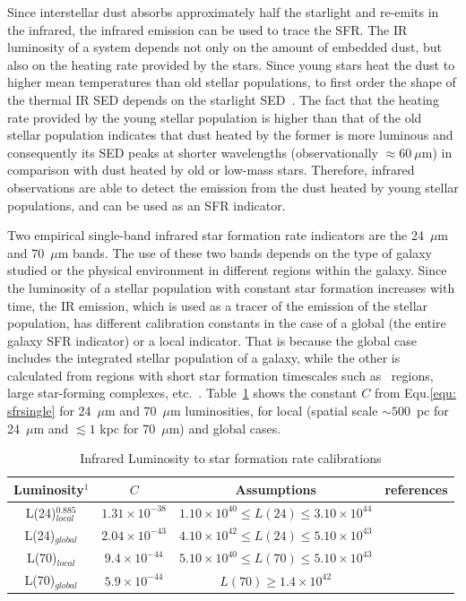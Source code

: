 Since interstellar dust absorbs approximately half the starlight and re-emits in the infrared, the infrared emission can be used to trace the SFR.
The IR luminosity of a system depends not only on the amount of embedded dust, but also on the heating rate provided by the stars. 
Since young stars heat the dust to higher mean temperatures than old stellar populations, to first order the shape of the thermal IR SED depends on the starlight SED~\citep{Helou86}.
The fact that the heating rate provided by the young stellar population is higher than  that of the old stellar population indicates that dust heated by the former is more luminous and consequently its SED peaks at shorter wavelengths (observationally $\approx 60~\mu$m) in comparison with dust heated by old or low-mass stars.
Therefore, infrared observations are able to detect the emission from the dust heated by young stellar populations, and can be used as an SFR indicator.  

Two empirical single-band infrared star formation rate indicators are the 24~$\mu$m and 70~$\mu$m bands.  
The use of these two bands depends on the type of galaxy studied or the physical environment in different regions within the galaxy. 
Since the luminosity of a stellar population with constant star formation increases with time, the IR emission, which is used as a tracer of the emission of the stellar population, has different calibration constants in the case of a global (the entire galaxy SFR indicator) or a local indicator.
That is because the global case includes the integrated stellar population of a galaxy, while the other is calculated from regions with short star formation timescales such as \hii~regions, large star-forming complexes, etc.~\cite{Calzetti13}.
Table~\ref{table2} shows the constant $C$ from Equ.\ref{equ: sfrsingle} for 24~$\mu$m and 70~$\mu$m luminosities, for local (spatial scale $\sim500$~pc for 24~$\mu$m and $\lesssim 1$ kpc for 70~$\mu$m) and global cases. 

\begin{table}
\centering
\caption{Infrared Luminosity to star formation rate calibrations}
\label{table2}
\begin{tabular}{ c c c c }
\hline\hline
Luminosity$^1$ & $C$ & Assumptions & references\\ 
\hline
L(24)$^{0.885}_{local}$ & $1.31 \times 10^{-38}$ &$1.10\times 10^{40} \le L(24) \le 3.10\times 10^{44}$&  \cite{Calzetti07}   \\ 
L(24)$_{global}$ & $2.04 \times 10^{-43}$ &$ 4.10\times 10^{42} \le L(24)  \le 5.10\times 10^{43}$& \cite{Calzetti07} \\
L(70)$_{local}$ & $9.4 \times 10^{-44} $ &$5.10\times 10^{40} \le  L(70) \le 5.10\times 10^{43}$& \cite{Li12} \\
L(70)$_{global}$& $5.9 \times 10^{-44}$ &$L(70) \ge 1.4 \times 10^{42} $& \cite{Li10}\\
\hline
\end{tabular}
\end{table}  

